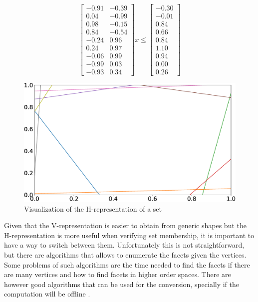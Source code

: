 \begin{equation}
	\label{eq:h-rep-example}
	\begin{bmatrix}
		-0.91 & -0.39 \\
		0.04  & -0.99 \\
		0.98  & -0.15 \\
		0.84  & -0.54 \\
		-0.24 & 0.96  \\
		0.24  & 0.97  \\
		-0.06 & 0.99  \\
		-0.99 & 0.03  \\
		-0.93 & 0.34
	\end{bmatrix}x \leq
	\begin{bmatrix}
		-0.30 \\
		-0.01 \\
		0.84  \\
		0.66  \\
		0.84  \\
		1.10  \\
		0.94  \\
		0.00  \\
		0.26
	\end{bmatrix}
\end{equation}

\begin{figure}[!htb]
	\centering
	\includegraphics[width=\linewidth]{imgs/h-rep}
	\caption{Visualization of the H-representation of a set}%
	\label{fig:h-rep-example}
\end{figure}

Given that the V-representation is easier to obtain from generic shapes but the
H-representation is more useful when verifying set membership, it is important
to have a way to switch between them. Unfortunately this is not straightforward,
but there are algorithms that allows to enumerate the facets given the vertices.
Some problems of such algorithms are the time needed to find the facets if there
are many vertices and how to find facets in higher order spaces. There are
however good algorithms that can be used for the conversion, specially if the
computation will be offline
\parencite{avis.bremner.ea:how,graham.frances-yao:finding,lee:on,mccallum.avis:linear}.

